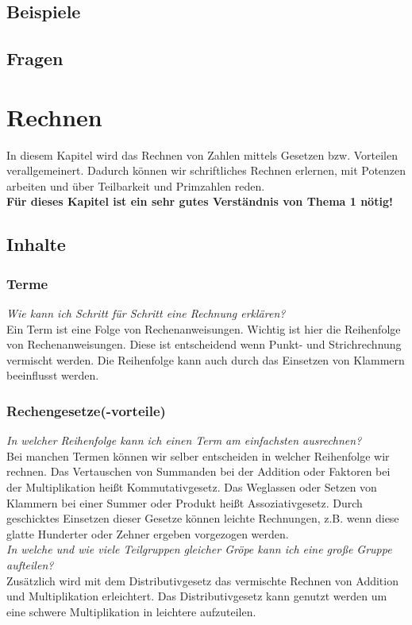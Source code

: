 \documentclass{article}
\begin{document}
\subsection{Beispiele}
\subsection{Fragen}
\newpage
\section{Rechnen}
In diesem Kapitel wird das Rechnen von Zahlen mittels Gesetzen bzw. Vorteilen verallgemeinert. Dadurch können wir schriftliches Rechnen erlernen, mit Potenzen arbeiten und über Teilbarkeit und Primzahlen reden.\\
\textbf{Für dieses Kapitel ist ein sehr gutes Verständnis von Thema 1 nötig!}
\subsection{Inhalte}
\subsubsection*{Terme}
\textit{Wie kann ich Schritt für Schritt eine Rechnung erklären?}\\
Ein Term ist eine Folge von Rechenanweisungen. Wichtig ist hier die Reihenfolge von Rechenanweisungen. Diese ist entscheidend wenn Punkt- und Strichrechnung vermischt werden. Die Reihenfolge kann auch durch das Einsetzen von Klammern beeinflusst werden.
\subsubsection*{Rechengesetze(-vorteile)}
\textit{In welcher Reihenfolge kann ich einen Term am einfachsten ausrechnen?}\\
Bei manchen Termen können wir selber entscheiden in welcher Reihenfolge wir rechnen. Das Vertauschen von Summanden bei der Addition oder Faktoren bei der Multiplikation heißt Kommutativgesetz. Das Weglassen oder Setzen von Klammern bei einer Summer oder Produkt heißt Assoziativgesetz.
Durch geschicktes Einsetzen dieser Gesetze können leichte Rechnungen, z.B. wenn diese glatte Hunderter oder Zehner ergeben vorgezogen werden. \\
\textit{In welche und wie viele Teilgruppen gleicher Gröpe kann ich eine große Gruppe aufteilen?} \\
Zusätzlich wird mit dem Distributivgesetz das vermischte Rechnen von Addition und Multiplikation erleichtert. Das Distributivgesetz kann genutzt werden um eine schwere Multiplikation in leichtere aufzuteilen.
\end{document}
